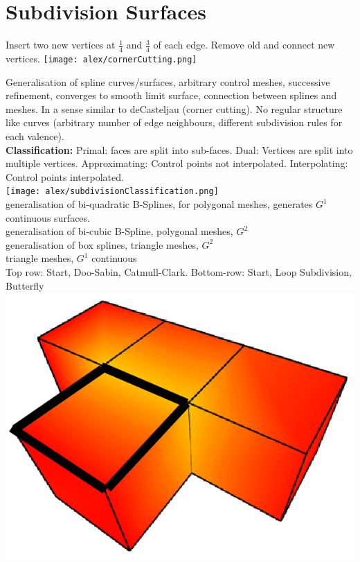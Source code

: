 \section{Subdivision Surfaces}

 Insert two new vertices at $\frac{1}{4}$ and $\frac{3}{4}$ of each edge. Remove old and connect new vertices.
\texttt{[image: alex/cornerCutting.png]}

 Generalisation of spline curves/surfaces, arbitrary control meshes, successive refinement, converges to smooth limit surface, connection between splines and meshes. In a sense similar to deCasteljau (corner cutting). No regular structure like curves (arbitrary number of edge neighbours, different subdivision rules for each valence). \\
\textbf{Classification:} Primal: faces are split into sub-faces. Dual: Vertices are split into multiple vertices. Approximating: Control points not interpolated. Interpolating: Control points interpolated.\\
\texttt{[image: alex/subdivisionClassification.png]}\\
generalisation of bi-quadratic B-Splines, for polygonal meshes, generates $G^1$ continuous surfaces.\\
  generalisation of bi-cubic B-Spline, polygonal meshes, $G^2$\\
 generalisation of box splines, triangle meshes, $G^2$\\
 triangle meshes, $G^1$ continuous\\
Top row: Start, Doo-Sabin, Catmull-Clark. Bottom-row: Start, Loop Subdivision, Butterfly \\
\includegraphics[width=0.3\columnwidth]{assets/arjun/start-square.png}
